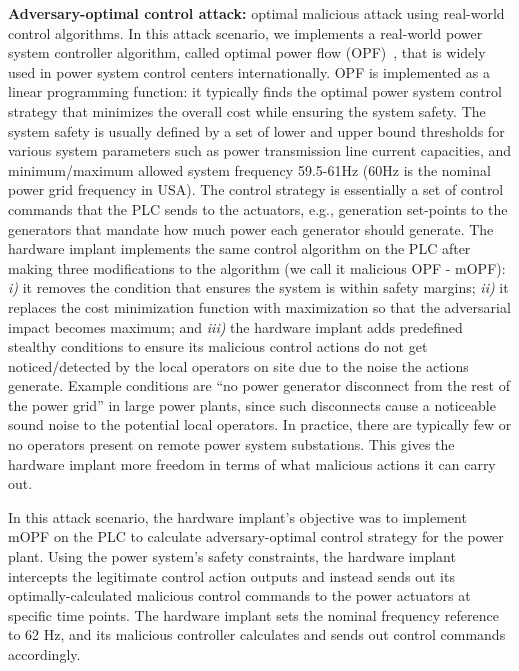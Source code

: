 \noindent\textbf{Adversary-optimal control attack:} optimal malicious attack using real-world control algorithms. In this attack scenario, we implements a real-world power system controller algorithm, called optimal power flow (OPF)~\cite{bose2015equivalent}, that is widely used in power system control centers internationally. OPF is implemented as a linear programming function: it typically finds the optimal power system control strategy that minimizes the overall cost while ensuring the system safety. The system safety is usually defined by a set of lower and upper bound thresholds for various system parameters such as power transmission line current capacities, and minimum/maximum allowed system frequency 59.5-61Hz (60Hz is the nominal power grid frequency in USA). The control strategy is essentially a set of control commands that the PLC sends to the actuators, e.g., generation set-points to the generators that mandate how much power each generator should generate. The hardware implant implements the same control algorithm on the PLC after making three modifications to the algorithm (we call it malicious OPF - mOPF): \textit{i)} it removes the condition that ensures the system is within safety margins; \textit{ii)} it replaces the cost minimization function with maximization so that the adversarial impact becomes maximum; and \textit{iii)} the hardware implant adds predefined stealthy conditions to ensure its malicious control actions do not get noticed/detected by the local operators on site due to the noise the actions generate. Example conditions are ``no power generator disconnect from the rest of the power grid'' in large power plants, since such disconnects cause a noticeable sound noise to the potential local operators. In practice, there are typically few or no operators present on remote power system substations. This gives the hardware implant more freedom in terms of what malicious actions it can carry out. 

In this attack scenario, the hardware implant's objective was to implement mOPF on the PLC to calculate adversary-optimal control strategy for the power plant. Using the power system's safety constraints, the hardware implant intercepts the legitimate control action outputs and instead sends out its optimally-calculated malicious control commands to the power actuators at specific time points. The hardware implant sets the nominal frequency reference to 62 Hz, and its malicious controller calculates and sends out control commands accordingly.  

